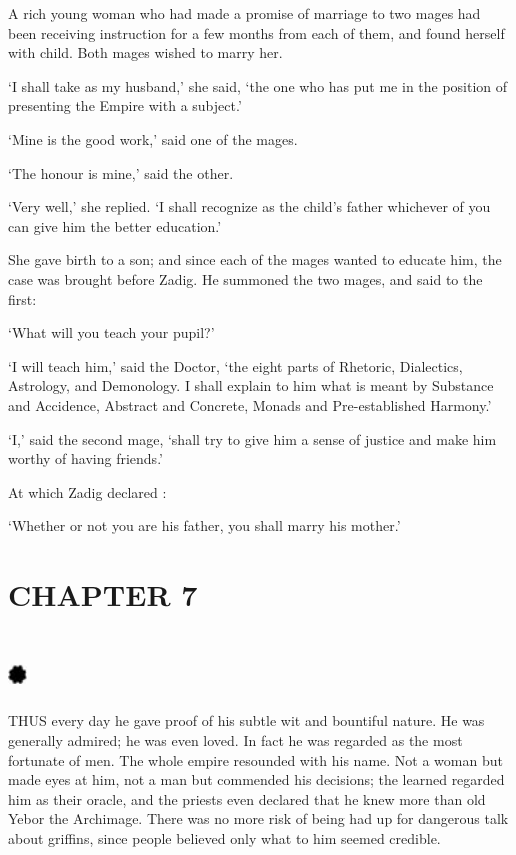 \documentclass{article}
\begin{document}
\begin{center}
A rich young woman who had made a promise of marriage to two mages had been receiving 
instruction for a few months from each of them, and found herself with child. Both 
mages wished to marry her. 

`I shall take as my husband,' she said, `the one who has put me in the position 
of presenting the Empire with a subject.' 

`Mine is the good work,' said one of the mages. 

`The honour is mine,' said the other. 

`Very well,' she replied. `I shall recognize as the child's father whichever of 
you can give him the better education.' 

She gave birth to a son; and since each of the mages wanted to educate him, the 
case was brought before Zadig. He summoned the two mages, and said to the first: 

`What will you teach your pupil?' 

`I will teach him,' said the Doctor, `the eight parts of Rhetoric, Dialectics, 
Astrology, and Demonology. I shall explain to him what is meant by Substance and 
Accidence, Abstract and Concrete, Monads and Pre-established Harmony.' 

`I,' said the second mage, `shall try to give him a sense of justice and make him 
worthy of having friends.' 

At which Zadig declared : 

`Whether or not you are his father, you shall marry his mother.'\pagebreak{} 

\section*{\textbf{CHAPTER 7  }}

\section*{%
\includegraphics[width=14pt, height=15pt, keepaspectratio=true]{Zadig or L'Ingenu - Voltaire-fig010.jpg}
}

 

THUS every day he gave proof of his subtle wit and bountiful nature. He was generally 
admired; he was even loved. In fact he was regarded as the most fortunate of men. 
The whole empire resounded with his name. Not a woman but made eyes at him, not 
a man but commended his decisions; the learned regarded him as their oracle, and 
the priests even declared that he knew more than old Yebor the Archimage. There 
was no more risk of being had up for dangerous talk about griffins, since people 
believed only what to him seemed credible. 


\end{center}
\end{document}
